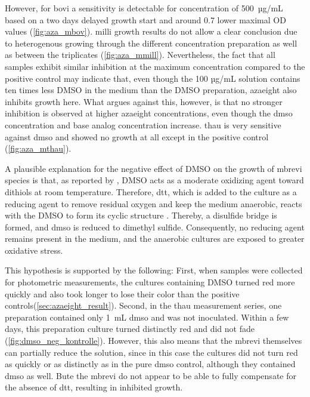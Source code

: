 However, for \acrshort{bovi} a sensitivity is detectable for concentration of 500~µg/mL based on a two days delayed growth start and around 0.7 lower maximal \acrshort{OD} values (\cref{fig:aza_mbov}). \acrshort{milli} growth results do not allow a clear conclusion due to heterogenous growing through the different concentration preparation as well as between the triplicates (\cref{fig:aza_mmill}). Nevertheless, the fact that all samples exhibit similar inhibition at the maximum concentration compared to the positive control may indicate that, even though the 100 µg/mL solution contains ten times less DMSO in the medium than the DMSO preparation, \acrshort{azaeight} also inhibits growth here. What argues against this, however, is that no stronger inhibition is observed at higher \acrshort{azaeight} concentrations, even though the \acrshort{dmso} concentration and base analog concentration increase. \acrshort{thau} is very sensitive against \acrshort{dmso} and showed no growth at all except in the positive control (\cref{fig:aza_mthau}).

A plausible explanation for the negative effect of DMSO on the growth of \acrshort{mbrevi} species is that, as reported by \citet{atcherEffectDMSOAqueous2013}, DMSO acts as a moderate oxidizing agent toward dithiols at room temperature. Therefore, \acrshort{dtt}, which is added to the culture as a reducing agent to remove residual oxygen and keep the medium anaerobic, reacts with the DMSO to form its cyclic structure \citep{sanzSimpleSelectiveOxidation2002}. Thereby, a disulfide bridge is formed, and \acrshort{dmso} is reduced to dimethyl sulfide. Consequently, no reducing agent remains present in the medium, and the anaerobic cultures are exposed to greater oxidative stress.

This hypothesis is supported by the following:
First, when samples were collected for photometric measurements, the cultures containing DMSO turned red more quickly and also took longer to lose their color than the positive controls(\cref{sec:azaeight_result}).
Second, in the \acrshort{thau} measurement series, one preparation contained only 1~mL \acrshort{dmso} and was not inoculated. Within a few days, this preparation culture turned distinctly red and did not fade (\cref{fig:dmso_neg_kontrolle}).
However, this also means that the \acrlong{mbrevi} themselves can partially reduce the solution, since in this case the cultures did not turn red as quickly or as distinctly as in the pure \acrshort{dmso} control, although they contained \acrshort{dmso} as well. Bute the \acrlong{mbrevi} do not appear to be able to fully compensate for the absence of \acrshort{dtt}, resulting in inhibited growth.

